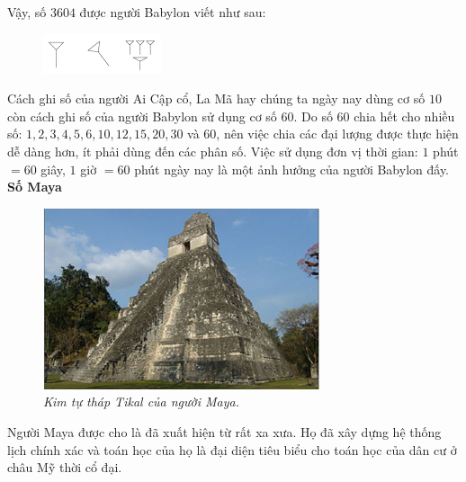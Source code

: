 \begin{multicols}{2}
\begin{figure}[H]
		\vspace*{-10pt}
	\end{figure}
	Vậy, số $3604$ được người Babylon viết như sau:
	\begin{figure}[H]
		\centering
		\captionsetup{labelformat= empty, justification=centering}
		\includegraphics[width=0.35\linewidth]{27}
		\vspace*{-10pt}
	\end{figure}
	Cách ghi số của người Ai Cập cổ, La Mã hay chúng ta ngày nay dùng cơ số $10$ còn cách ghi số của người Babylon sử dụng cơ số $60$. Do số $60$ chia hết cho nhiều số: $1,2,3,4,5,6, 10, 12, 15, 20,30$ và $60$, nên việc chia các đại lượng được thực hiện dễ dàng hơn, ít phải dùng đến các phân số. Việc sử dụng đơn vị thời gian: $1$ phút $= 60$ giây, $1$ giờ $= 60$ phút ngày nay là một ảnh hưởng của người Babylon đấy.
	\vskip 0.1cm
	\textbf{\color{toancuabi}Số Maya}
	\vskip 0.1cm
	\begin{figure}[H]
		\centering
		\vspace*{-10pt}
		\captionsetup{labelformat= empty, justification=centering}
		\includegraphics[width=1\linewidth]{28}
		\caption{\textit{\color{toancuabi}Kim tự tháp Tikal của người Maya.}}
		\vspace*{-10pt}
	\end{figure}
	Người Maya  được cho là đã xuất hiện từ rất xa xưa. Họ đã xây dựng hệ thống lịch chính xác và toán học của họ là đại diện tiêu biểu cho toán học của dân cư ở châu Mỹ thời cổ đại.

\end{multicols}
